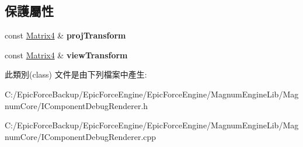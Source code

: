 \subsection*{保護屬性}
\begin{DoxyCompactItemize}
\item 
const \hyperlink{class_magnum_1_1_matrix4}{Matrix4} \& {\bfseries proj\+Transform}\hypertarget{class_magnum_1_1_i_component_debug_renderer_ad4d68353b69e764bd43978e6f9eca818}{}\label{class_magnum_1_1_i_component_debug_renderer_ad4d68353b69e764bd43978e6f9eca818}

\item 
const \hyperlink{class_magnum_1_1_matrix4}{Matrix4} \& {\bfseries view\+Transform}\hypertarget{class_magnum_1_1_i_component_debug_renderer_a446abcc3d901904613135a53a5857e14}{}\label{class_magnum_1_1_i_component_debug_renderer_a446abcc3d901904613135a53a5857e14}

\end{DoxyCompactItemize}


此類別(class) 文件是由下列檔案中產生\+:\begin{DoxyCompactItemize}
\item 
C\+:/\+Epic\+Force\+Backup/\+Epic\+Force\+Engine/\+Epic\+Force\+Engine/\+Magnum\+Engine\+Lib/\+Magnum\+Core/I\+Component\+Debug\+Renderer.\+h\item 
C\+:/\+Epic\+Force\+Backup/\+Epic\+Force\+Engine/\+Epic\+Force\+Engine/\+Magnum\+Engine\+Lib/\+Magnum\+Core/I\+Component\+Debug\+Renderer.\+cpp\end{DoxyCompactItemize}
